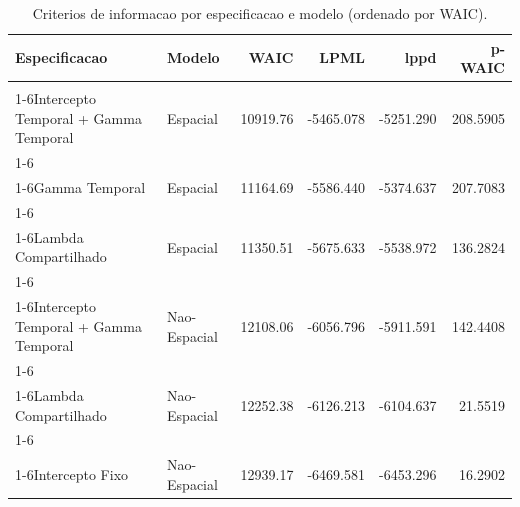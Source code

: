 \documentclass[
]{article}
\begin{document}
\begin{longtable}[t]{llrrrr}
\caption{\label{tab:tab-criteria}Criterios de informacao por especificacao e modelo (ordenado por WAIC).}\\
\toprule
Especificacao & Modelo & WAIC & LPML & lppd & p-WAIC\\
\midrule
\cellcolor{gray!10}{Intercepto Temporal i.i.d.} & \cellcolor{gray!10}{Espacial} & \cellcolor{gray!10}{10914.39} & \cellcolor{gray!10}{-5458.340} & \cellcolor{gray!10}{-5302.494} & \cellcolor{gray!10}{154.7015}\\
\cmidrule{1-6}\pagebreak[0]
Intercepto Temporal + Gamma Temporal & Espacial & 10919.76 & -5465.078 & -5251.290 & 208.5905\\
\cmidrule{1-6}\pagebreak[0]
\cellcolor{gray!10}{Lambda Dinamico Regional} & \cellcolor{gray!10}{Nao-Espacial} & \cellcolor{gray!10}{11114.17} & \cellcolor{gray!10}{-5559.205} & \cellcolor{gray!10}{-5314.200} & \cellcolor{gray!10}{242.8835}\\
\cmidrule{1-6}\pagebreak[0]
Gamma Temporal & Espacial & 11164.69 & -5586.440 & -5374.637 & 207.7083\\
\cmidrule{1-6}\pagebreak[0]
\cellcolor{gray!10}{Lambda Dinamico Regional} & \cellcolor{gray!10}{Espacial} & \cellcolor{gray!10}{11168.86} & \cellcolor{gray!10}{-5588.476} & \cellcolor{gray!10}{-5313.277} & \cellcolor{gray!10}{271.1517}\\
\cmidrule{1-6}\pagebreak[0]
Lambda Compartilhado & Espacial & 11350.51 & -5675.633 & -5538.972 & 136.2824\\
\cmidrule{1-6}\pagebreak[0]
\cellcolor{gray!10}{Intercepto Fixo} & \cellcolor{gray!10}{Espacial} & \cellcolor{gray!10}{11466.48} & \cellcolor{gray!10}{-5733.598} & \cellcolor{gray!10}{-5588.105} & \cellcolor{gray!10}{145.1337}\\
\cmidrule{1-6}\pagebreak[0]
Intercepto Temporal + Gamma Temporal & Nao-Espacial & 12108.06 & -6056.796 & -5911.591 & 142.4408\\
\cmidrule{1-6}\pagebreak[0]
\cellcolor{gray!10}{Gamma Temporal} & \cellcolor{gray!10}{Nao-Espacial} & \cellcolor{gray!10}{12227.15} & \cellcolor{gray!10}{-6115.061} & \cellcolor{gray!10}{-6003.024} & \cellcolor{gray!10}{110.5534}\\
\cmidrule{1-6}\pagebreak[0]
Lambda Compartilhado & Nao-Espacial & 12252.38 & -6126.213 & -6104.637 & 21.5519\\
\cmidrule{1-6}\pagebreak[0]
\cellcolor{gray!10}{Intercepto Temporal i.i.d.} & \cellcolor{gray!10}{Nao-Espacial} & \cellcolor{gray!10}{12544.97} & \cellcolor{gray!10}{-6273.020} & \cellcolor{gray!10}{-6190.241} & \cellcolor{gray!10}{82.2448}\\
\cmidrule{1-6}\pagebreak[0]
Intercepto Fixo & Nao-Espacial & 12939.17 & -6469.581 & -6453.296 & 16.2902\\
\bottomrule
\end{longtable}
\endgroup{}
\end{document}
